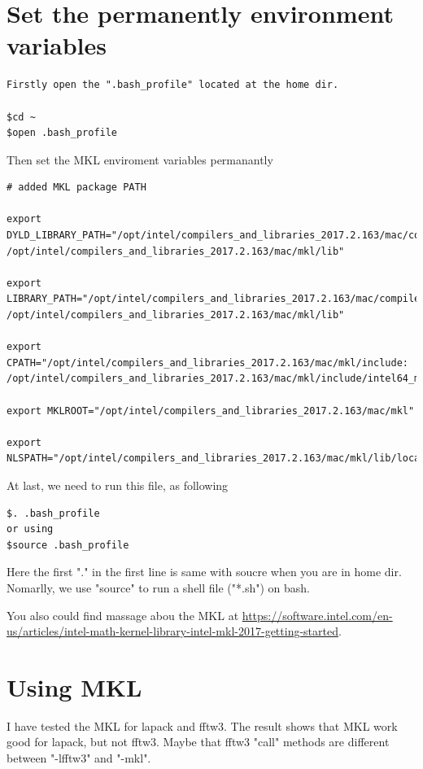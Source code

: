 \section{Set the permanently environment variables}

\begin{verbatim}
Firstly open the ".bash_profile" located at the home dir. 

$cd ~
$open .bash_profile
\end{verbatim}

Then set the MKL enviroment variables permanantly

\begin{verbatim}
# added MKL package PATH

export DYLD_LIBRARY_PATH="/opt/intel/compilers_and_libraries_2017.2.163/mac/compiler/lib:
/opt/intel/compilers_and_libraries_2017.2.163/mac/mkl/lib"

export LIBRARY_PATH="/opt/intel/compilers_and_libraries_2017.2.163/mac/compiler/lib:
/opt/intel/compilers_and_libraries_2017.2.163/mac/mkl/lib"

export CPATH="/opt/intel/compilers_and_libraries_2017.2.163/mac/mkl/include:
/opt/intel/compilers_and_libraries_2017.2.163/mac/mkl/include/intel64_mac/ilp64"

export MKLROOT="/opt/intel/compilers_and_libraries_2017.2.163/mac/mkl"

export NLSPATH="/opt/intel/compilers_and_libraries_2017.2.163/mac/mkl/lib/locale/%l_%t/%N"

\end{verbatim}

At last, we need to run this file, as  following 

\begin{verbatim}
$. .bash_profile
or using
$source .bash_profile
\end{verbatim}

Here the first "." in the first line is same with soucre when you are in home dir.  Nomarlly, we use "source" to run a shell file ("*.sh") on bash.

You also could find massage abou the MKL at \url{https://software.intel.com/en-us/articles/intel-math-kernel-library-intel-mkl-2017-getting-started}.

\section{Using MKL}

I have tested the MKL for lapack and fftw3. The result shows that MKL work good for lapack, but not fftw3. Maybe that fftw3 "call" methods are different between "-lfftw3" and "-mkl".

